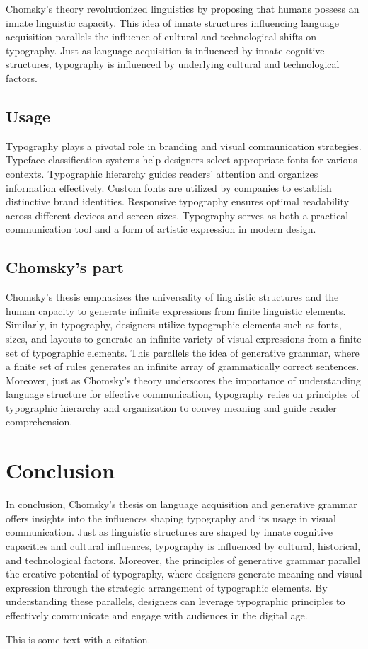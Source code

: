 \documentclass[11pt]{article}
\begin{document}
    Chomsky's theory revolutionized linguistics by proposing that humans possess an innate linguistic
    capacity. This idea of innate structures influencing language acquisition parallels the influence
    of cultural and technological shifts on typography. Just as language acquisition is influenced by
    innate cognitive structures, typography is influenced by underlying cultural and technological factors.

    \subsection{Usage}
    Typography plays a pivotal role in branding and visual communication strategies.
    Typeface classification systems help designers select appropriate fonts for various contexts.
    Typographic hierarchy guides readers' attention and organizes information effectively.
    Custom fonts are utilized by companies to establish distinctive brand identities.
    Responsive typography ensures optimal readability across different devices and screen sizes.
    Typography serves as both a practical communication tool and a form of artistic expression in modern design.
    \subsection{Chomsky's part}
    Chomsky's thesis emphasizes the universality of linguistic structures and the human capacity to generate
    infinite expressions from finite linguistic elements. Similarly, in typography, designers utilize typographic
    elements such as fonts, sizes, and layouts to generate an infinite variety of visual expressions from a finite
    set of typographic elements. This parallels the idea of generative grammar, where a finite set of rules generates
    an infinite array of grammatically correct sentences. Moreover, just as Chomsky's theory underscores the importance
    of understanding language structure for effective communication, typography relies on principles of typographic
    hierarchy and organization to convey meaning and guide reader comprehension.

    \section{Conclusion}
    In conclusion, Chomsky's thesis on language acquisition and generative grammar offers insights into the influences
    shaping typography and its usage in visual communication. Just as linguistic structures are shaped by innate
    cognitive capacities and cultural influences, typography is influenced by cultural, historical, and technological
    factors. Moreover, the principles of generative grammar parallel the creative potential of typography,
    where designers generate meaning and visual expression through the strategic arrangement of typographic elements.
    By understanding these parallels, designers can leverage typographic principles to effectively communicate
    and engage with audiences in the digital age.

    This is some text with a citation\cite{types}.

\end{document}
